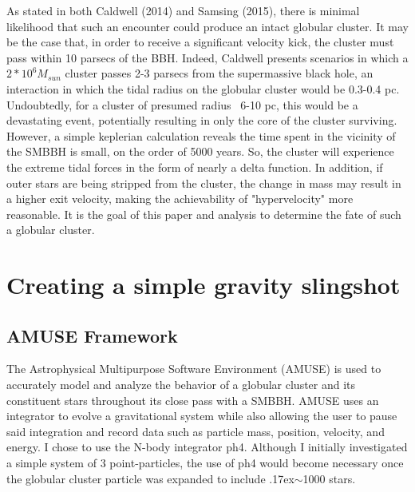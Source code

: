 \documentclass{aastex62}
\begin{document}
As stated in both Caldwell (2014) and Samsing (2015), there is minimal likelihood that such an encounter could produce an intact globular cluster. It may be the case that, in order to receive a significant velocity kick, the cluster must pass within 10 parsecs of the BBH. Indeed, Caldwell presents scenarios in which a $2*10^6M_{sun}$ cluster passes 2-3 parsecs from the supermassive black hole, an interaction in which the tidal radius on the globular cluster would be 0.3-0.4 pc. Undoubtedly, for a cluster of presumed radius ~6-10 pc, this would be a devastating event, potentially resulting in only the core of the cluster surviving. However, a simple keplerian calculation reveals the time spent in the vicinity of the SMBBH is small, on the order of 5000 years. So, the cluster will experience the extreme tidal forces in the form of nearly a delta function. In addition, if outer stars are being stripped from the cluster, the change in mass may result in a higher exit velocity, making the achievability of "hypervelocity" more reasonable. It is the goal of this paper and analysis to determine the fate of such a globular cluster. 

\section{Creating a simple gravity slingshot}
\subsection{AMUSE Framework}
The Astrophysical Multipurpose Software Environment (AMUSE) is used to accurately model and analyze the behavior of a globular cluster and its constituent stars throughout its close pass with a SMBBH. AMUSE uses an integrator to evolve a gravitational system while also allowing the user to pause said integration and record data such as particle mass, position, velocity, and energy. I chose to use the N-body integrator ph4. Although I initially investigated a simple system of 3 point-particles, the use of ph4 would become necessary once the globular cluster particle was expanded to include {\raise.17ex\hbox{$\scriptstyle\mathtt{\sim}$}}1000 stars. 
\end{document}
